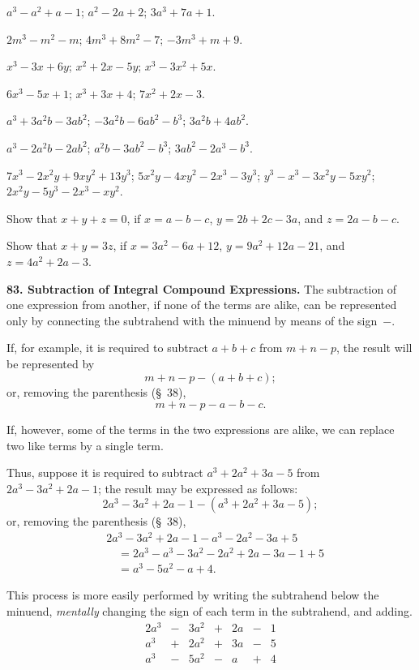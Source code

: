 \documentclass[12pt]{book}[2005/09/16]
\newcommand{\Paragraph}[1]{\medskip\par\textbf{#1}}
\newcommand{\Item}[1]{\vspace{4pt plus 16pt}\makebox[1em][r]{\textbf{#1}\ }}
\begin{document}
\Item{12.}  $a^{3} - a^{2} + a - 1$; $a^{2} - 2a + 2$; $3a^{3} + 7a + 1$.

\Item{13.}  $2m^{3} - m^{2} - m$; $4m^{3} + 8m^{2} - 7$; $-3m^{3} + m + 9$.

\Item{14.}  $x^{3} - 3x + 6y$; $x^{2} + 2x - 5y$; $x^{3} - 3x^{2} + 5x$.

\Item{15.}  $6x^{3} - 5x + 1$; $x^{3} + 3x + 4$; $7x^{2} + 2x - 3$.

\Item{16.}  $a^{3} + 3a^{2}b - 3ab^{2}$; $-3a^{2}b - 6ab^{2} - b^{3}$; $3a^{2}b + 4ab^{2}$.

\Item{17.}  $a^{3} - 2a^{2}b - 2ab^{2}$; $a^{2}b - 3ab^{2} - b^{3}$; $3ab^{2} - 2a^{3} - b^{3}$.

\Item{18.}  $7x^{3} - 2x^{2}y + 9xy^{2} + 13y^{3}$; $5x^{2}y - 4xy^{2} - 2x^{3} - 3y^{3}$;
$y^{3} - x^{3} - 3x^{2}y - 5xy^{2}$; $2x^{2}y - 5y^{3} - 2x^{3} - xy^{2}$.

\Item{19.}  Show that $x + y + z = 0$, if $x = a - b - c$,
$y = 2b + 2c - 3a$, and $z = 2a - b - c$.

\Item{20.}  Show that $x + y = 3z$, if $x = 3a^{2} - 6a + 12$,
$y = 9a^{2} + 12a - 21$, and $z = 4a^{2} + 2a - 3$.

\Paragraph{83.  Subtraction of Integral Compound Expressions.}  The
subtraction of one expression from another, if none of the
terms are alike, can be represented only by connecting the
subtrahend with the minuend by means of the sign~$-$.

If, for example, it is required to subtract $a + b + c$ from
$m + n - p$, the result will be represented by
\[
m + n - p - (a + b + c);
\]
or, removing the parenthesis (§~38),
\[
m + n - p - a - b - c.
\]

If, however, some of the terms in the two expressions are
alike, we can replace two like terms by a single term.

Thus, suppose it is required to subtract $a^{3} + 2a^{2} + 3a - 5$
from $2a^{3} - 3a^{2} + 2a - 1$; the result may be expressed as
follows:
\[
2a^{3} - 3a^{2} + 2a - 1 - (a^{3} + 2a^{2} + 3a - 5);
\]
or, removing the parenthesis (§~38),
\begin{align*}
&2a^{3} - 3a^{2} + 2a - 1 - a^{3} - 2a^{2} - 3a + 5 \\
&\quad= 2a^{3} - a^{3} - 3a^{2} - 2a^{2} + 2a - 3a - 1 + 5 \\
&\quad= a^{3} - 5a^{2} - a + 4.
\end{align*}

This process is more easily performed by writing the subtrahend
below the minuend, \emph{mentally} changing the sign of
each term in the subtrahend, and adding.
\[
\begin{array}{r*{3}{cr}}
2a^{3} &-& 3a^{2} &+& 2a &-& 1 \\
 a^{3} &+& 2a^{2} &+& 3a &-& 5 \\
\hline
 a^{3} &-& 5a^{2} &-&  a &+& 4 \\
\end{array}
\]
\end{document}
